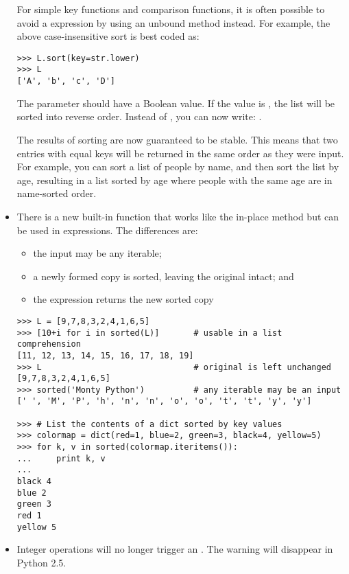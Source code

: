\documentclass{howto}
\begin{document}
\begin{itemize}
For simple key functions and comparison functions, it is often
possible to avoid a  expression by using an unbound
method instead.  For example, the above case-insensitive sort is best
coded as:

\begin{verbatim}
>>> L.sort(key=str.lower)
>>> L
['A', 'b', 'c', 'D']
\end{verbatim}       

The  parameter should have a Boolean value.  If the value
is , the list will be sorted into reverse order.
Instead of , you can now write: .

The results of sorting are now guaranteed to be stable.  This means
that two entries with equal keys will be returned in the same order as
they were input.  For example, you can sort a list of people by name,
and then sort the list by age, resulting in a list sorted by age where
people with the same age are in name-sorted order.

\item There is a new built-in function
 that works like the in-place
 method but can be used in
expressions.  The differences are:
  \begin{itemize}
  \item the input may be any iterable;
  \item a newly formed copy is sorted, leaving the original intact; and
  \item the expression returns the new sorted copy
  \end{itemize}

\begin{verbatim}
>>> L = [9,7,8,3,2,4,1,6,5]
>>> [10+i for i in sorted(L)]       # usable in a list comprehension
[11, 12, 13, 14, 15, 16, 17, 18, 19]
>>> L                               # original is left unchanged
[9,7,8,3,2,4,1,6,5]
>>> sorted('Monty Python')          # any iterable may be an input
[' ', 'M', 'P', 'h', 'n', 'n', 'o', 'o', 't', 't', 'y', 'y']

>>> # List the contents of a dict sorted by key values
>>> colormap = dict(red=1, blue=2, green=3, black=4, yellow=5)
>>> for k, v in sorted(colormap.iteritems()):
...     print k, v
...
black 4
blue 2
green 3
red 1
yellow 5
\end{verbatim}

\item Integer operations will no longer trigger an .
The  warning will disappear in Python 2.5.


\end{itemize}
\end{document}
